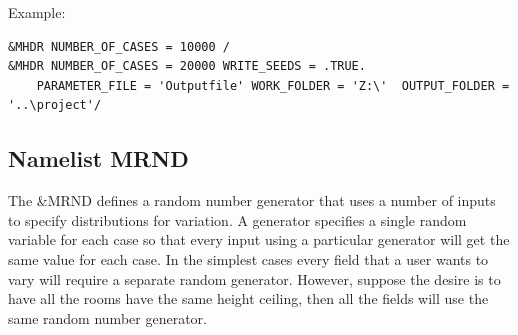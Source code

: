\documentclass[12pt,twoside]{book}
\begin{document}
\vspace{\baselineskip}
\noindent Example:
\begin{lstlisting}
&MHDR NUMBER_OF_CASES = 10000 /
&MHDR NUMBER_OF_CASES = 20000 WRITE_SEEDS = .TRUE.
	PARAMETER_FILE = 'Outputfile' WORK_FOLDER = 'Z:\'  OUTPUT_FOLDER = '..\project'/
\end{lstlisting}



\subsection{Namelist MRND}

The {\ct \&MRND} defines a random number generator that uses a number of inputs to specify distributions for variation. A generator specifies a single random variable for each case so that every input using a particular generator will get the same value for each case. In the simplest cases every field that a user wants to vary will require a separate random generator. However, suppose the desire is to have all the rooms have the same height ceiling, then all the fields will use the same random number generator. %
\end{document}
